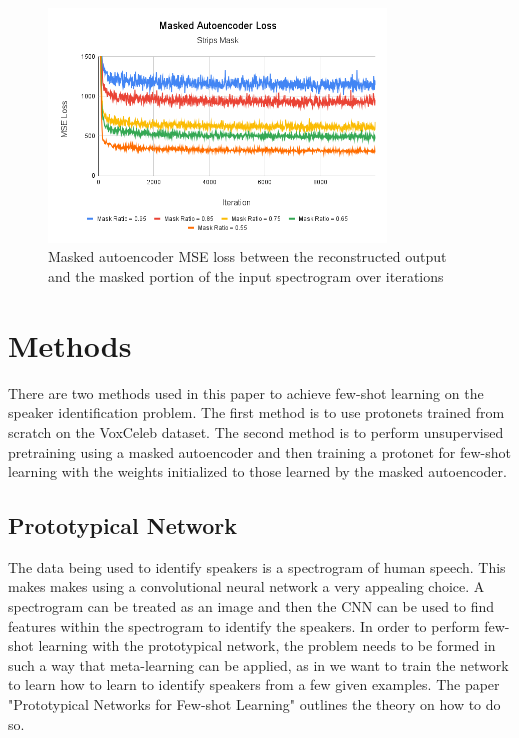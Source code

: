 \documentclass{article}
\begin{document}
\begin{figure}
  \centering
  \includegraphics[width=0.8\textwidth]{Images/Masked Autoencoder Loss.png}
  \caption{Masked autoencoder MSE loss between the reconstructed output and the masked portion of the input spectrogram over iterations}
  \label{fig:MAELoss}
\end{figure}

\section{ Methods }
There are two methods used in this paper to achieve few-shot learning on the speaker identification problem. The first
method is to use protonets trained from scratch on the VoxCeleb dataset. The second method is to perform unsupervised
pretraining using a masked autoencoder and then training a protonet for few-shot learning with the weights initialized
to those learned by the masked autoencoder.

\subsection{Prototypical Network}
The data being used to identify speakers is a spectrogram of human speech. This makes makes using a convolutional neural network
a very appealing choice. A spectrogram can be treated as an image and then the CNN can be used to find features within
the spectrogram to identify the speakers. In order to perform few-shot learning with the prototypical network, the problem
needs to be formed in such a way that meta-learning can be applied, as in we want to train the network to learn how to learn
to identify speakers from a few given examples. The paper "Prototypical Networks for Few-shot Learning" \cite{DBLP:journals/corr/SnellSZ17}
outlines the theory on how to do so.
\end{document}
